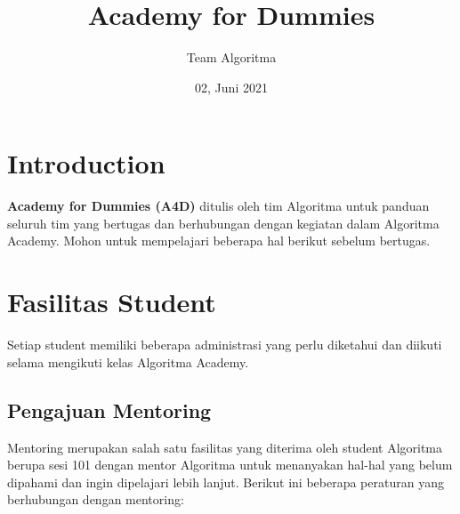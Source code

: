 \documentclass[
]{book}
\title{Academy for Dummies}
\author{Team Algoritma}
\date{02, Juni 2021}
\begin{document}
\maketitle

{
\setcounter{tocdepth}{1}
\tableofcontents
}
\hypertarget{introduction}{%
\chapter{Introduction}\label{introduction}}

\textbf{Academy for Dummies (A4D)} ditulis oleh tim Algoritma untuk panduan seluruh tim yang bertugas dan berhubungan dengan kegiatan dalam Algoritma Academy. Mohon untuk mempelajari beberapa hal berikut sebelum bertugas.

\hypertarget{fasilitas-student}{%
\chapter{Fasilitas Student}\label{fasilitas-student}}

Setiap student memiliki beberapa administrasi yang perlu diketahui dan diikuti selama mengikuti kelas Algoritma Academy.

\hypertarget{pengajuan-mentoring}{%
\section{Pengajuan Mentoring}\label{pengajuan-mentoring}}

Mentoring merupakan salah satu fasilitas yang diterima oleh student Algoritma berupa sesi 101 dengan mentor Algoritma untuk menanyakan hal-hal yang belum dipahami dan ingin dipelajari lebih lanjut. Berikut ini beberapa peraturan yang berhubungan dengan mentoring:
\end{document}
